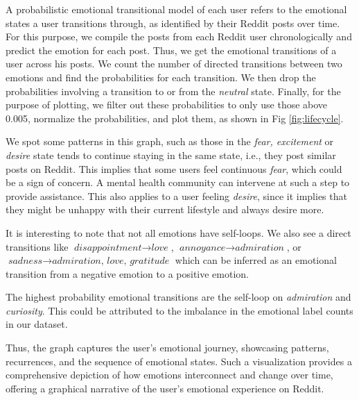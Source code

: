 \documentclass[conference,compsoc]{IEEEtran}
\begin{document}
A probabilistic emotional transitional model of each user refers to the emotional states a user transitions through, as identified by their Reddit posts over time. For this purpose, we compile the posts from each Reddit user chronologically and predict the emotion for each post. Thus, we get the emotional transitions of a user across his posts. We count the number of directed transitions between two emotions and find the probabilities for each transition. We then drop the probabilities involving a transition to or from the \textit{neutral} state. Finally, for the purpose of plotting, we filter out these probabilities to only use those above 0.005, normalize the probabilities, and plot them, as shown in Fig \ref{fig:lifecycle}.

We spot some patterns in this graph, such as those in the \textit{fear, excitement} or \textit{desire} state tends to continue staying in the same state, i.e., they post similar posts on Reddit. This implies that some users feel continuous \textit{fear}, which could be a sign of concern. A mental health community can intervene at such a step to provide assistance. This also applies to a user feeling \textit{desire}, since it implies that they might be unhappy with their current lifestyle and always desire more.

It is interesting to note that not all emotions have self-loops. We also see a direct transitions like $\textit{disappointment} \rightarrow \textit{love}$, $\textit{annoyance} \rightarrow \textit{admiration}$, or $\textit{sadness} \rightarrow \textit{admiration, love, gratitude}$ which can be inferred as an emotional transition from a negative emotion to a positive emotion.

The highest probability emotional transitions are the self-loop on \textit{admiration} and \textit{curiosity}. This could be attributed to the imbalance in the emotional label counts in our dataset. 

Thus, the graph captures the user's emotional journey, showcasing patterns, recurrences, and the sequence of emotional states. Such a visualization provides a comprehensive depiction of how emotions interconnect and change over time, offering a graphical narrative of the user's emotional experience on Reddit.
\end{document}
